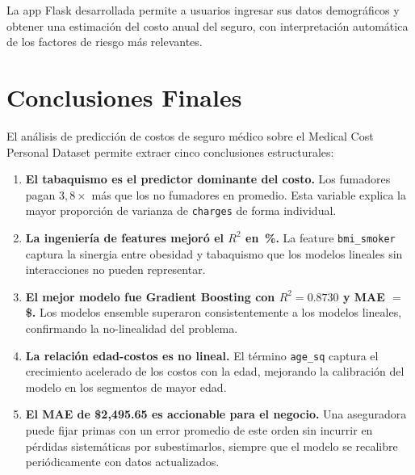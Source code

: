 \documentclass[12pt, a4paper]{article}
\begin{document}
La app Flask desarrollada permite a usuarios ingresar sus datos
demográficos y obtener una estimación del costo anual del seguro,
con interpretación automática de los factores de riesgo más relevantes.

\section{Conclusiones Finales}

El análisis de predicción de costos de seguro médico sobre el Medical
Cost Personal Dataset permite extraer cinco conclusiones estructurales:

\begin{enumerate}
  \item \textbf{El tabaquismo es el predictor dominante del costo.}
        Los fumadores pagan $3{,}8\times$ más que los no fumadores en
        promedio. Esta variable explica la mayor proporción de varianza
        de \texttt{charges} de forma individual.

  \item \textbf{La ingeniería de features mejoró el $R^2$ en
        \,\%.} La feature \texttt{bmi\_smoker} captura la
        sinergia entre obesidad y tabaquismo que los modelos lineales
        sin interacciones no pueden representar.

  \item \textbf{El mejor modelo fue Gradient Boosting con $R^2 = 0.8730$ 
        y MAE $=$ \$.} Los modelos ensemble superaron
        consistentemente a los modelos lineales, confirmando la
        no-linealidad del problema.

  \item \textbf{La relación edad-costos es no lineal.} El término
        \texttt{age\_sq} captura el crecimiento acelerado de los costos
        con la edad, mejorando la calibración del modelo en los segmentos
        de mayor edad.

  \item \textbf{El MAE de \$2,495.65 es accionable para el negocio.}
        Una aseguradora puede fijar primas con un error promedio de este
        orden sin incurrir en pérdidas sistemáticas por subestimarlos,
        siempre que el modelo se recalibre periódicamente con datos
        actualizados.
\end{enumerate}
\end{document}
